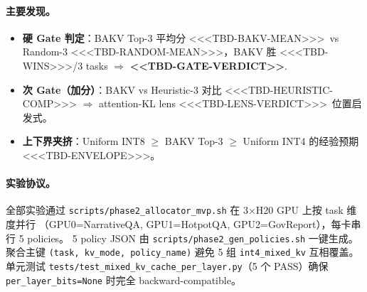 \paragraph{主要发现。}
\begin{itemize}
    \item \textbf{硬 Gate 判定}：BAKV Top-3 平均分 \textless<<TBD-BAKV-MEAN>>\textgreater\ vs Random-3
    \textless<<TBD-RANDOM-MEAN>>\textgreater，BAKV 胜 \textless<<TBD-WINS>>\textgreater/3 tasks
    $\Rightarrow$ \textbf{<<TBD-GATE-VERDICT>>}.
    \item \textbf{次 Gate（加分）}：BAKV vs Heuristic-3 对比
    \textless<<TBD-HEURISTIC-COMP>>\textgreater
    $\Rightarrow$ attention-KL lens \textless<<TBD-LENS-VERDICT>>\textgreater\ 位置启发式。
    \item \textbf{上下界夹挤}：Uniform INT8 $\geq$ BAKV Top-3 $\geq$ Uniform INT4 的经验预期
    \textless<<TBD-ENVELOPE>>\textgreater。
\end{itemize}

\paragraph{实验协议。}
全部实验通过 \texttt{scripts/phase2\_allocator\_mvp.sh} 在 3$\times$H20 GPU 上按 task 维度并行
（GPU0=NarrativeQA, GPU1=HotpotQA, GPU2=GovReport），每卡串行 5 policies。
5 policy JSON 由 \texttt{scripts/phase2\_gen\_policies.sh} 一键生成。聚合主键
\texttt{(task, kv\_mode, policy\_name)} 避免 5 组 \texttt{int4\_mixed\_kv} 互相覆盖。
单元测试 \texttt{tests/test\_mixed\_kv\_cache\_per\_layer.py}（5 个 PASS）确保
\texttt{per\_layer\_bits=None} 时完全 backward-compatible。
